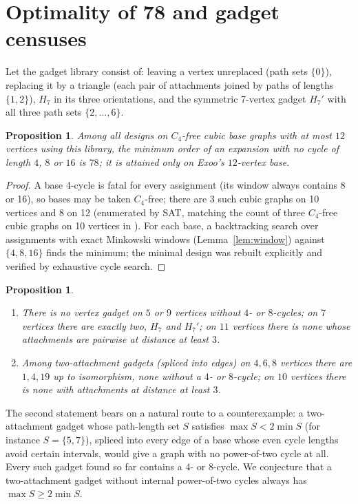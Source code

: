 \documentclass[11pt]{article}
\newtheorem{proposition}[theorem]{Proposition}
\theoremstyle{remark}
\theoremstyle{definition}
\begin{document}
\section{Optimality of 78 and gadget censuses}

Let the gadget library consist of: leaving a vertex unreplaced (path sets $\{0\}$), replacing it by a triangle (each pair of attachments joined by paths of lengths $\{1,2\}$), $H_7$ in its three orientations, and the symmetric 7-vertex gadget $H_7'$ with all three path sets $\{2,\dots,6\}$.

\begin{proposition}\label{prop:78}
Among all designs on $C_4$-free cubic base graphs with at most $12$ vertices using this library, the minimum order of an expansion with no cycle of length $4$, $8$ or $16$ is $78$; it is attained only on Exoo's $12$-vertex base.
\end{proposition}

\begin{proof}
A base 4-cycle is fatal for every assignment (its window always contains 8 or 16), so bases may be taken $C_4$-free; there are 3 such cubic graphs on 10 vertices and 8 on 12 (enumerated by SAT, matching the count of three $C_4$-free cubic graphs on 10 vertices in \cite{Exoo}). For each base, a backtracking search over assignments with exact Minkowski windows (Lemma~\ref{lem:window}) against $\{4,8,16\}$ finds the minimum; the minimal design was rebuilt explicitly and verified by exhaustive cycle search.
\end{proof}

\begin{proposition}
\begin{enumerate}
\item There is no vertex gadget on $5$ or $9$ vertices without $4$- or $8$-cycles; on $7$ vertices there are exactly two, $H_7$ and $H_7'$; on $11$ vertices there is none whose attachments are pairwise at distance at least $3$.
\item Among two-attachment gadgets (spliced into edges) on $4,6,8$ vertices there are $1,4,19$ up to isomorphism, none without a $4$- or $8$-cycle; on $10$ vertices there is none with attachments at distance at least $3$.
\end{enumerate}
\end{proposition}

The second statement bears on a natural route to a counterexample: a two-attachment gadget whose path-length set $S$ satisfies $\max S<2\min S$ (for instance $S=\{5,7\}$), spliced into every edge of a base whose even cycle lengths avoid certain intervals, would give a graph with no power-of-two cycle at all. Every such gadget found so far contains a 4- or 8-cycle. We conjecture that a two-attachment gadget without internal power-of-two cycles always has $\max S\ge 2\min S$.
\end{document}
